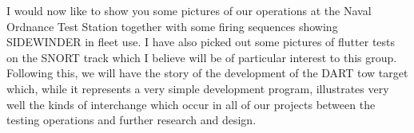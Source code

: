 \documentclass{memoir}
\begin{document}
I would now like to show you some pictures of our operations at the Naval Ordnance Test Station together with some firing sequences showing SIDEWINDER in fleet use. I have also picked out some pictures of flutter tests on the SNORT track which I believe will be of particular interest to this group. Following this, we will have the story of the development of the DART tow target which, while it represents a very simple development program, illustrates very well the kinds of interchange which occur in all of our projects between the testing operations and further research and design.
\end{document}
